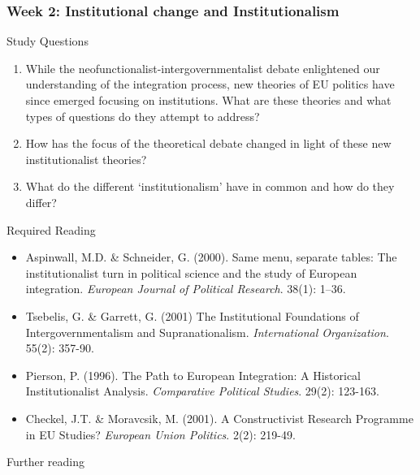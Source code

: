 \subsubsection*{Week 2: Institutional change and Institutionalism}

Study Questions

\begin{enumerate}
	\item While the neofunctionalist-intergovernmentalist debate enlightened our understanding of the integration process, new theories of EU politics have since emerged focusing on institutions. What are these theories and what types of questions do they attempt to address? 
	\item How has the focus of the theoretical debate changed in light of these new institutionalist theories? 
	\item What do the different `institutionalism' have in common and how do they differ?
\end{enumerate}

\noindent Required Reading

\begin{itemize}
	\item Aspinwall, M.D. \& Schneider, G. (2000). Same menu, separate tables: The institutionalist turn in political science and the study of European integration. \textit{European Journal of Political Research}. 38(1): 1–36.
	\item Tsebelis, G. \& Garrett, G. (2001) The Institutional Foundations of Intergovernmentalism and Supranationalism. \textit{International Organization}. 55(2): 357-90.
	\item Pierson, P. (1996). The Path to European Integration: A Historical Institutionalist Analysis. \textit{Comparative Political Studies}. 29(2): 123-163.
	\item Checkel, J.T. \& Moravcsik, M. (2001). A Constructivist Research Programme in EU Studies? \textit{European Union Politics}. 2(2): 219-49.
\end{itemize}

\noindent Further reading

